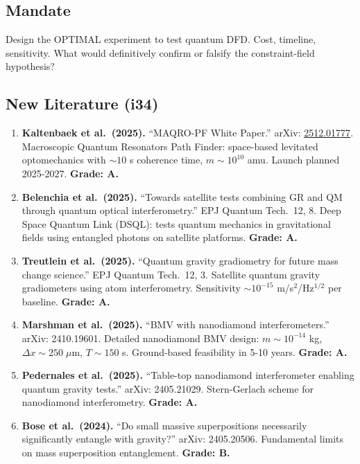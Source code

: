 \documentclass[11pt,a4paper]{article}
\begin{document}
\subsection{Mandate}

Design the OPTIMAL experiment to test quantum DFD. Cost, timeline, sensitivity. What would definitively confirm or falsify the constraint-field hypothesis?

\subsection{New Literature (i34)}

\begin{enumerate}
\item \textbf{Kaltenbaek et al.\ (2025).} ``MAQRO-PF White Paper.'' arXiv: \href{https://arxiv.org/abs/2512.01777}{2512.01777}. Macroscopic Quantum Resonators Path Finder: space-based levitated optomechanics with $\sim10$ s coherence time, $m \sim 10^{10}$ amu. Launch planned 2025-2027. \textbf{Grade: A.}

\item \textbf{Belenchia et al.\ (2025).} ``Towards satellite tests combining GR and QM through quantum optical interferometry.'' EPJ Quantum Tech.\ 12, 8. Deep Space Quantum Link (DSQL): tests quantum mechanics in gravitational fields using entangled photons on satellite platforms. \textbf{Grade: A.}

\item \textbf{Treutlein et al.\ (2025).} ``Quantum gravity gradiometry for future mass change science.'' EPJ Quantum Tech.\ 12, 3. Satellite quantum gravity gradiometers using atom interferometry. Sensitivity $\sim 10^{-15}$ m/s$^2$/Hz$^{1/2}$ per baseline. \textbf{Grade: A.}

\item \textbf{Marshman et al.\ (2025).} ``BMV with nanodiamond interferometers.'' arXiv: 2410.19601. Detailed nanodiamond BMV design: $m \sim 10^{-14}$ kg, $\Delta x \sim 250\;\mu$m, $T \sim 150$ s. Ground-based feasibility in 5-10 years. \textbf{Grade: A.}

\item \textbf{Pedernales et al.\ (2025).} ``Table-top nanodiamond interferometer enabling quantum gravity tests.'' arXiv: 2405.21029. Stern-Gerlach scheme for nanodiamond interferometry. \textbf{Grade: A.}

\item \textbf{Bose et al.\ (2024).} ``Do small massive superpositions necessarily significantly entangle with gravity?'' arXiv: 2405.20506. Fundamental limits on mass superposition entanglement. \textbf{Grade: B.}
\end{enumerate}
\end{document}
